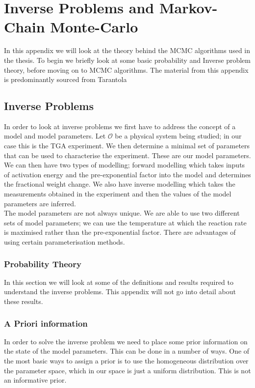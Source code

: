 \chapter{Inverse Problems and Markov-Chain Monte-Carlo}
\label{stat_appendix}
In this appendix we will look at the theory behind the MCMC algorithms used in the thesis. To begin we briefly look at some basic probability and Inverse problem theory, before moving on to MCMC algorithms. The material from this appendix is predominantly sourced from Tarantola \cite{tarantola05} 
\section{Inverse Problems}
In order to look at inverse problems we first have to address the concept of a model and model parameters. Let $\mathcal{O}$ be a physical system being studied; in our case this is the TGA experiment. We then determine a minimal set of parameters that can be used to characterise the experiment. These are our model parameters. We can then have two types of modelling; forward modelling which takes inputs of activation energy and the pre-exponential factor into the model and determines the fractional weight change. We also have inverse modelling which takes the measurements obtained in the experiment and then the values of the model parameters are inferred.\\

The model parameters are not always unique. We are able to use two different sets of model parameters; we can use the temperature at which the reaction rate is maximised rather than the pre-exponential factor. There are advantages of using certain parameterisation methods.  

\subsection{Probability Theory}
In this section we will look at some of the definitions and results required to understand the inverse problems. This appendix will not go into detail about these results.


\subsection{A Priori information}
In order to solve the inverse problem we need to place some prior information on the state of the model parameters. This can be done in a number of ways. One of the most basic ways to assign a prior is to use the homogeneous distribution over the parameter space, which in our space is just a uniform distribution. This is not an informative prior. 

